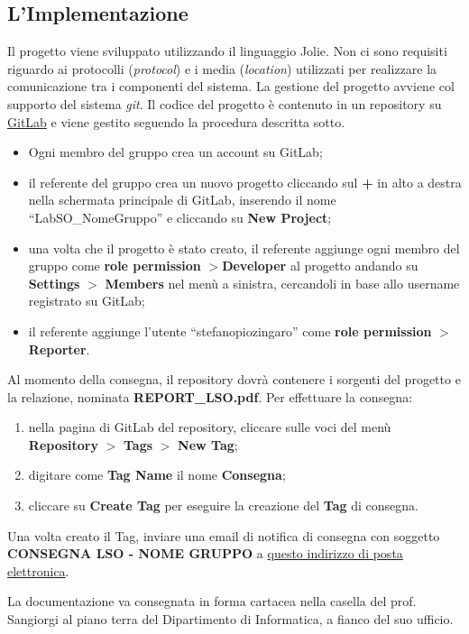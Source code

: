 \subsection{L'Implementazione}
Il progetto viene sviluppato utilizzando il linguaggio Jolie. Non ci sono requisiti riguardo ai protocolli (\textit{protocol}) e i media (\textit{location}) utilizzati per realizzare la comunicazione tra i componenti del sistema. La gestione del progetto avviene col supporto del sistema \textit{git}. Il codice del progetto è contenuto in un repository su \href{http://gitlab.com}{GitLab} e viene gestito seguendo la procedura descritta sotto.
%
\begin{tcolorbox}[colback=blue!20!white,colframe=blue!75!black,title=GitLab]
 \begin{itemize}
  \item Ogni membro del gruppo crea un account su GitLab;
  \item il referente del gruppo  crea un nuovo progetto cliccando sul \textbf{+} in alto a destra nella schermata principale di GitLab, inserendo il nome ``LabSO\_NomeGruppo'' e cliccando su \textbf{New Project};
  \item una volta che il progetto è stato creato, il referente aggiunge ogni membro del gruppo come \textbf{role permission} $>$\textbf{Developer} al progetto andando su \textbf{Settings} $>$ \textbf{Members} nel menù a sinistra, cercandoli in base allo username registrato su GitLab;
  \item il referente aggiunge l'utente ``stefanopiozingaro'' come \textbf{role permission} $>$ \textbf{Reporter}.
 \end{itemize}
\end{tcolorbox}
%
Al momento della consegna, il repository dovrà contenere i sorgenti del progetto e la relazione, nominata \textbf{REPORT\_LSO.pdf}. Per effettuare la consegna:
\begin{enumerate}
 \item nella pagina di GitLab del repository, cliccare sulle voci del menù \textbf{Repository} $>$ \textbf{Tags} $>$ \textbf{New Tag};
 \item digitare come \textbf{Tag Name} il nome \textbf{Consegna};
 \item cliccare su \textbf{Create Tag} per eseguire la creazione del \textbf{Tag} di consegna.
\end{enumerate}
%
Una volta creato il Tag, inviare una email di notifica di consegna con soggetto \textbf{CONSEGNA LSO - NOME GRUPPO} a \href{stefanopio.zingaro@unibo.it}{questo indirizzo di posta elettronica}.
\begin{tcolorbox}[colback=yellow!20!white,colframe=yellow!75!black,title=\textbf{N.B.}]
 La documentazione va consegnata in forma cartacea nella casella del prof. Sangiorgi al piano terra del Dipartimento di Informatica, a fianco del suo ufficio.
\end{tcolorbox}

